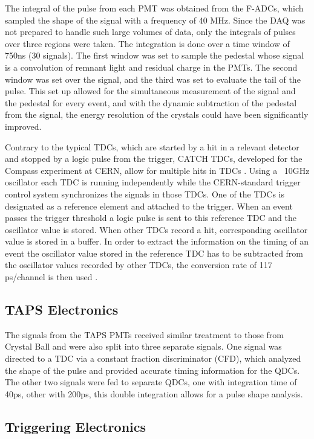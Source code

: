\indent The integral of the pulse from each PMT was obtained from the F-ADCs, which sampled the shape of the signal with a frequency of 40 MHz. Since the DAQ was not prepared to handle such large volumes of data, only the integrals of pulses over three regions were taken. The integration is done over a time window of 750ns (30 signals). The first window was set to sample the pedestal whose signal is a convolution of remnant light and residual charge in the PMTs. The second window was set over the signal, and the third was set to evaluate the tail of the pulse. This set up allowed for the simultaneous measurement of the signal and the pedestal for every event, and with the dynamic subtraction of the pedestal from the signal, the energy resolution of the crystals could have been significantly improved.

\indent Contrary to the typical TDCs, which are started by a hit in a relevant detector and stopped by a logic pulse from the trigger, CATCH TDCs, developed for the Compass experiment at CERN, allow for multiple hits in TDCs \cite{gbruan}. Using a ~10GHz oscillator each TDC is running independently while the CERN-standard trigger control system synchronizes the signals in those TDCs. One of the TDCs is designated as a reference element and attached to the trigger. When an event passes the trigger threshold a logic pulse is sent to this reference TDC and the oscillator value is stored. When other TDCs record a hit, corresponding oscillator value is stored in a buffer. In order to extract the information on the timing of an event the oscillator value stored in the reference TDC has to be subtracted from the oscillator values recorded by other TDCs, the conversion rate of 117 ps/channel is then used \cite{lschmitt}.

\subsection{TAPS Electronics}

\indent The signals from the TAPS PMTs received similar treatment to those from Crystal Ball and were also split into three separate signals. One signal was directed to a TDC via a constant fraction discriminator (CFD), which analyzed the shape of the pulse and provided accurate timing information for the QDCs. The other two signals were fed to separate QDCs, one with integration time of 40ps, other with 200ps, this double integration allows for a pulse shape analysis.

\subsection{Triggering Electronics}

